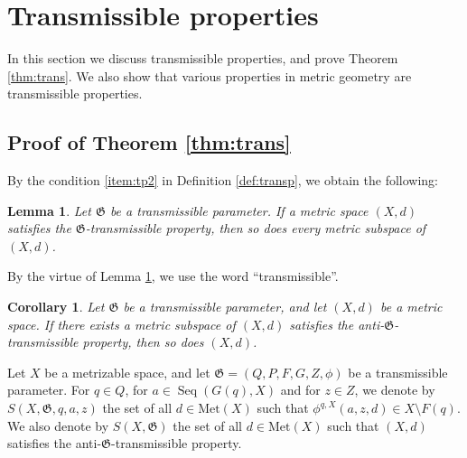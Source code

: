 \documentclass[a4paper, 12pt]{amsart}
\theoremstyle{plain}
\newtheorem{cor}[thm]{Corollary}
\newtheorem{lem}[thm]{Lemma}
\theoremstyle{definition}
\theoremstyle{remark}
\DeclareMathOperator{\seq}{Seq}
\newcommand{\met}[1]{\mathrm{Met}(#1)}
\begin{document}


\section{Transmissible  properties}\label{sec:trans}
In this section we discuss  transmissible properties, 
and prove Theorem \ref{thm:trans}. 
We also show that 
various properties in metric geometry are transmissible properties.  
\subsection{Proof of Theorem \ref{thm:trans}}
By the condition 
\ref{item:tp2} in Definition \ref{def:transp}, 
we obtain the following:
\begin{lem}\label{lem:here}
Let $\mathfrak{G}$ be a transmissible parameter. 
If a metric space 
$(X, d)$ 
satisfies the 
$\mathfrak{G}$-transmissible property, 
then so does every metric subspace of 
$(X, d)$. 
\end{lem}
By the virtue of Lemma \ref{lem:here}, 
we use the word ``transmissible''. 
\begin{cor}\label{cor:anti}
Let $\mathfrak{G}$ be a transmissible parameter, 
and let $(X, d)$ be a metric space. 
If there exists a metric subspace of 
$(X, d)$ 
satisfies the anti-$\mathfrak{G}$-transmissible property, 
then so does $(X, d)$. 
\end{cor}



Let $X$ be a metrizable space, 
and let 
$\mathfrak{G}=(Q, P, F, G, Z, \phi)$ 
be a transmissible  parameter. 
For $q\in Q$, 
for 
$a\in \seq(G(q), X)$ 
and for
$z\in Z$, 
we denote by 
$S( X, \mathfrak{G}, q, a, z)$ 
the set of all 
$d\in \met{X}$ 
such that 
$\phi^{q, X}(a, z, d)\in X\setminus F(q)$. 
We also denote by 
$S(X, \mathfrak{G})$ 
the set of all 
$d\in \met{X}$ 
such that 
$(X, d)$ 
satisfies the 
anti-$\mathfrak{G}$-transmissible property. 
\end{document}
